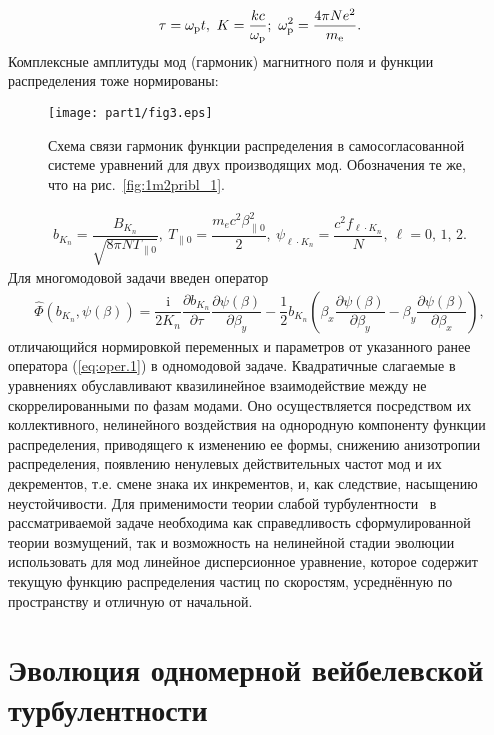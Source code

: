 \begin{align}
\label{eq19plus2}
    \tau=\wpl t, \
    K=\dfrac{kc}{\wpl}; \ 
    \wpl^2=\dfrac{4\pi Ne^2}{\me}.
\end{align}
Комплексные амплитуды мод (гармоник) магнитного поля и функции распределения тоже нормированы:
\begin{figure}[b]
\centering
\texttt{[image: part1/fig3.eps]}
\caption{Схема связи гармоник функции распределения в самосогласованной системе уравнений для двух производящих мод. Обозначения те же, что на рис.~\ref{fig:1m2pribl_1}.}
\label{fig:2m2pribl}
\end{figure}


\begin{align}
\label{eq19plus1}
    b_{K_{n}}=\dfrac{B_{K_{n}}}{\sqrt{8\pi N T_{\|0}}},\
    T_{\|0}=\dfrac{m_ec^2\beta_{\|0}^2}{2},\  \psi_{\ell\cdot K_{n}}=\dfrac{c^2f_{\ell\cdot K_{n}}}{N},
    \ \ell=0,\,1,\,2.  
\end{align}
Для многомодовой задачи введен оператор 
\begin{align}
\label{eq:oper.2}\hat \Phi(b_{K_n},\psi(\beta)) =  \dfrac{\mathrm{i}}{2K_n}\dfrac{\partial b_{K_n}}{\partial \tau}\dfrac{\partial \psi(\beta)}{\partial \beta_y} -\dfrac{1}{2}b_{K_n} \left(\beta_x\dfrac{\partial \psi(\beta)}{\partial \beta_y}-\beta_y\dfrac{\partial \psi(\beta)}{\partial \beta_x}\right) ,
\end{align}
отличающийся нормировкой переменных и параметров от указанного ранее оператора (\ref{eq:oper.1}) в одномодовой задаче. Квадратичные слагаемые в уравнениях обуславливают квазилинейное взаимодействие между не скоррелированными по фазам модами. Оно осуществляется посредством их коллективного, нелинейного воздействия на однородную компоненту функции распределения, приводящего к изменению ее формы, снижению анизотропии распределения, появлению ненулевых действительных частот мод и их декрементов, т.е. смене знака их инкрементов, и, как следствие, насыщению неустойчивости. Для применимости теории слабой турбулентности~\cite{Krall1973,Vedenov1962} в рассматриваемой задаче необходима как справедливость сформулированной теории возмущений, так и возможность на нелинейной стадии эволюции использовать для мод линейное дисперсионное уравнение, которое содержит текущую функцию распределения частиц по скоростям, усреднённую по пространству и отличную от начальной.


\section{Эволюция одномерной вейбелевской турбулентности}\label{sec:ch1/sec2}

